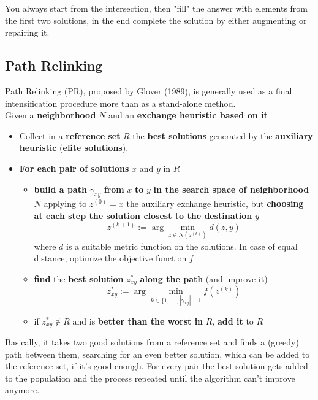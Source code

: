 \documentclass[11pt]{article}
\begin{document}
	You always start from the intersection, then "fill" the answer with elements from the first two solutions, in the end complete the solution by either augmenting or repairing it.\\
	
	\newpage
	
	\subsection{Path Relinking}
	Path Relinking (PR), proposed by Glover (1989), is generally used as a final intensification procedure more than as a stand-alone method.\\
	
	Given a \textbf{neighborhood} $N$ and an \textbf{exchange heuristic based on it}
	\begin{itemize}
		\item Collect in a \textbf{reference set} $R$ the \textbf{best solutions} generated by the \textbf{auxiliary heuristic} (\textbf{elite solutions}).\\
		
		\item \textbf{For each pair of solutions} $x$ and $y$ in $R$
		\begin{itemize}
			\item \textbf{build a path} $\gamma_{xy}$ \textbf{from} $x$ \textbf{to} $y$ \textbf{in the search space of neighborhood} $N$ applying to $z^{(0)} = x$ the auxiliary exchange heuristic, but \textbf{choosing at each step the solution closest to the destination} $y$
			$$ z^{(k+1)} := \arg \min_{z \in N(z^{(k)})} d (z, y ) $$
			where $d$ is a suitable metric function on the solutions. In case of equal distance, optimize the objective function $f$
			
			\item \textbf{find} the \textbf{best solution} $z_{xy}^\ast$ \textbf{along the path} (and improve it)
			$$ z^\ast_{xy} := \arg \min_{k \in \{1 , \, ... \, , |\gamma_{xy}| - 1} f (z^{(k)}) $$
			
			\item if $z^\ast_{xy} \notin R$ and is \textbf{better than the worst in} $R$, \textbf{add it} to $R$
		\end{itemize}
		\nn
	\end{itemize}
	
	Basically, it takes two good solutions from a reference set and finds a (greedy) path between them, searching for an even better solution, which can be added to the reference set, if it's good enough. For every pair the best solution gets added to the population and the process repeated until the algorithm can't improve anymore.\\
	
\end{document}
